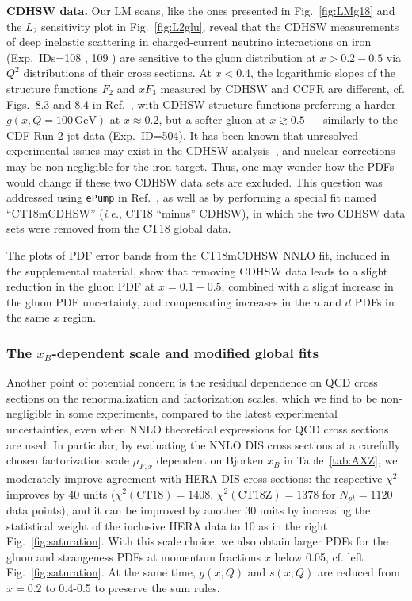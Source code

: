 {\bf CDHSW data.}
Our LM scans, like the ones presented in Fig.~\ref{fig:LMg18} and the
$L_2$ sensitivity plot in Fig.~\ref{fig:L2glu}, reveal
that the CDHSW measurements of deep inelastic scattering
in charged-current neutrino interactions on iron
(Exp.~IDs=108 \cite{Berge:1989hr}, 109 \cite{Berge:1989hr})
are sensitive to the gluon distribution at $x > 0.2-0.5$ via $Q^2$
distributions of their cross sections. At $x <0.4$, the logarithmic
slopes of the structure functions $F_2$ and $xF_3$ measured by CDHSW
and CCFR are different, cf. Figs.~8.3 and 8.4 in
Ref.~\cite{Seligman:1997fe}, with CDHSW structure functions preferring
a harder $g(x,Q\!=\!100\,\mathrm{GeV})$ at $x\!\approx\!0.2$, but a softer
gluon at $x\!\gtrsim\!0.5$ --- similarly to the CDF Run-2 jet data
(Exp.~ID=504). It has been known that unresolved experimental issues may exist
in the CDHSW analysis~\cite{Barone:1999yv}, and nuclear corrections
may be non-negligible for the iron target. Thus,
one may wonder how the PDFs would change if
these two CDHSW data sets are excluded. This question was addressed
using  \texttt{ePump} in Ref.~\cite{Hou:2019gfw}, as well as by performing a special fit named
``CT18mCDHSW'' ({\it i.e.}, CT18 ``minus'' CDHSW), in which
the two CDHSW data sets were removed from the CT18 global data.

The plots of PDF error bands from the CT18mCDHSW NNLO fit, included in
the supplemental material, show that removing CDHSW data leads to a
slight reduction in the gluon PDF at $x=0.1-0.5$, combined with a
slight increase in the gluon PDF uncertainty, and compensating
increases in the $u$ and $d$ PDFs in the same $x$ region. 

\subsubsection{The $x_B$-dependent scale and modified global fits}
%
Another point of potential concern is the residual dependence on QCD
cross sections on the renormalization and factorization scales, which
we find to be non-negligible in some experiments, compared to the
latest experimental uncertainties, even when NNLO theoretical
expressions for QCD cross sections are used. In particular, by
evaluating the NNLO DIS cross sections at a carefully chosen
factorization scale $\mu_{F,x}$
dependent on Bjorken $x_B$ in Table~\ref{tab:AXZ},
we moderately improve agreement with HERA DIS cross sections:
the respective $\chi^2$ improves by 40 units
($\chi^2(\mbox{CT18})=1408$, $\chi^2(\mbox{CT18Z})=1378$ for
$N_{pt}=1120$ data points), and it can be improved by another 30 units
by increasing the statistical weight of the inclusive HERA data to 10 as in
the right Fig.~\ref{fig:saturation}. With this scale choice, we also obtain
larger PDFs for the gluon and strangeness PDFs at momentum fractions $x$
below 0.05, cf. left Fig.~\ref{fig:saturation}. At the same time,
$g(x,Q)$ and $s(x,Q)$ are reduced from $x=0.2$ to 0.4-0.5 to preserve
the sum rules.

